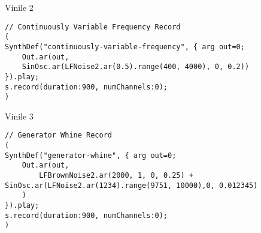 Vinile 2

\begin{lstlisting}[style=SuperCollider-IDE]
// Continuously Variable Frequency Record
(
SynthDef("continuously-variable-frequency", { arg out=0;
    Out.ar(out,
    SinOsc.ar(LFNoise2.ar(0.5).range(400, 4000), 0, 0.2))
}).play;
s.record(duration:900, numChannels:0);
)
\end{lstlisting}

\clearpage 

Vinile 3

\begin{lstlisting}[style=SuperCollider-IDE]
// Generator Whine Record
(
SynthDef("generator-whine", { arg out=0;
    Out.ar(out,
        LFBrownNoise2.ar(2000, 1, 0, 0.25) + SinOsc.ar(LFNoise2.ar(1234).range(9751, 10000),0, 0.012345)
    )
}).play;
s.record(duration:900, numChannels:0);
)
\end{lstlisting}

